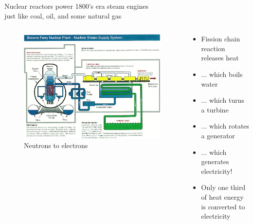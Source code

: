 \documentclass{beamer}
\begin{document}
        \begin{frame}{Nuclear reactors power 1800's era steam engines \\ just like coal, oil, and some natural gas}

            \begin{columns}[T]

                \begin{column}{0.5\textwidth}
                    \begin{figure}
                        \centering
                        \includegraphics[width=\textwidth]{./img/bwrBop.png}
                        \caption*{Neutrons to electrons}
                    \end{figure}
                \end{column}

                \begin{column}{0.5\textwidth}
                    \begin{itemize}
                        \item Fission chain reaction releases heat
                        \pause
                        \item ... which boils water
                        \pause
                        \item ... which turns a turbine
                        \pause
                        \item ... which rotates a generator
                        \pause
                        \item ... which generates electricity!
                        \pause

                        \vspace{2em}

                        \item Only one third of heat energy is converted to electricity

                    \end{itemize}
                \end{column}

            \end{columns}

        \end{frame}
\end{document}

